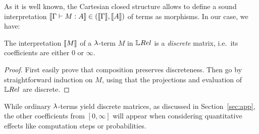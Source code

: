 
As it is well known, the Cartesian closed structure %
allows to define a sound interpretation $\llbracket\Gamma\vdash M:A\rrbracket\in{}(\llbracket\Gamma\rrbracket,\llbracket A\rrbracket)$ of terms as morphisms.
In our case, we have:

\begin{proposition}\label{prop:descrete}
 The interpretation $\llbracket M\rrbracket$ of a $\lambda$-term $M$ in $\LREL$ is a \emph{discrete} matrix, i.e.\ its coefficients are either $0$ or $\infty$.
\end{proposition}
\begin{proof}
 First easily prove that composition preserves discreteness.
 Then go by straightforward induction on $M$, using that the projections and evaluation of  $\LREL$ are discrete.
\end{proof}

While ordinary $\lambda$-terms yield discrete matrices, 
as discussed in Section~\ref{sec:app}, the other coefficients from $[0,\infty]$ will appear when considering quantitative effects like computation steps or probabilities.

